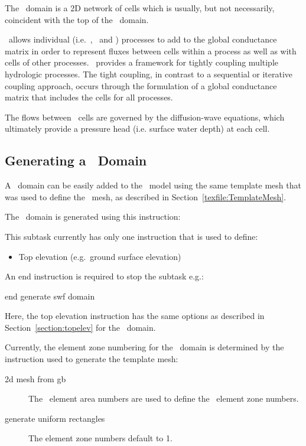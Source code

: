 \label{texfile:SWF}
The \swf\ domain is a 2D network of cells which is usually, but not necessarily, coincident with the top of the \gwf\ domain.

\mfus\ allows individual (i.e.\ \gwf, \swf\ and \cln)  processes  to add to the global
conductance matrix in order to represent fluxes between cells
within a process as well as with cells of other processes.
\mfus\ provides a framework for tightly
coupling multiple hydrologic processes. The tight coupling, in
contrast to a sequential or iterative coupling approach, occurs
through the formulation of a global conductance matrix that
includes the cells for all processes.

The flows between \swf\ cells are governed by the diffusion-wave equations, which ultimately provide a pressure head (i.e. surface water depth) at each cell.

\subsection{Generating a \swf\ Domain}
A \swf\ domain can be easily added to the \mfus\ model using the same template mesh that was used to define the \gwf\ mesh, as described in Section~\ref{texfile:TemplateMesh}.

The \swf\ domain is generated using this instruction:

    {This subtask currently has only one instruction that is used to define:
     \begin{itemize}
        \item Top elevation (e.g.\ ground surface elevation)
    \end{itemize}

    An end instruction is required to stop the subtask e.g.:

    {\Large \sf end generate swf domain}
    }

Here, the \textsf{top elevation} instruction has the same options as described in Section~\ref{section:topelev} for the \gwf\ domain.

Currently, the element zone numbering for the \swf\ domain is determined by the instruction used to generate the template mesh:
\begin{description}
  \item[2d mesh from gb] The \gb\ element area numbers are used to define the \mfus\ element zone numbers.
  \item[generate uniform rectangles] The element zone numbers default to 1.
\end{description}

